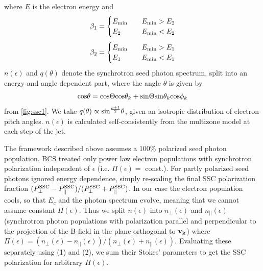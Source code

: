 where $E$ is the electron energy and
\begin{equation} 
\beta_1 =
  \begin{cases}
    E_{\rm min}       & \quad  E_{\rm min} > E_2\\
    E_2  & \quad  E_{\rm min} < E_2\\
  \end{cases}
\end{equation}
\begin{equation}
\beta_2 =
  \begin{cases}
    E_{\rm min}       & \quad  E_{\rm min} > E_1\\
    E_1  & \quad  E_{\rm min} < E_1\\
  \end{cases}
\end{equation}
$n(\epsilon)$ and $q(\theta)$ denote the synchrotron seed photon spectrum, split into an energy and angle dependent part, where the angle $\theta$ is given by 
\begin{equation}
    {\rm cos}\theta = {\rm cos}\Theta {\rm cos}\theta_k + {\rm sin} \Theta {\rm sin} \theta_k {\rm cos} \phi_k 
\end{equation}
from \cref{fig:ssc1}. We take $q(\theta) \propto {\rm sin}^{\frac{p+1}{2}}\theta$, given an isotropic distribution of electron pitch angles. $n(\epsilon)$ is calculated self-consistently from the multizone model at each step of the jet. %

 The framework described above assumes a 100\% polarized seed photon population. BCS treated only power law electron populations with synchrotron polarization independent of $\epsilon$ (i.e. $\Pi(\epsilon) =$ const.). For partly polarized seed photons \citet{bonometto_polarization_1970} ignored energy dependence, simply re-scaling the final SSC polarization fraction $(P^{\rm SSC}_{\perp} - P^{\rm SSC}_{||})/(P^{\rm SSC}_{\perp} + P^{\rm SSC}_{||})$. In our case the electron population cools, so that $E_c$ and the photon spectrum evolve, meaning that we cannot assume constant $\Pi(\epsilon)$. Thus we split $n(\epsilon)$ into $n_{\perp}(\epsilon)$ and $n_{||}(\epsilon)$ (synchrotron photon populations with polarization parallel and perpendicular to the projection of the B-field in the plane orthogonal to $\bf{v_k}$) where $\Pi(\epsilon) = (n_{\perp}(\epsilon) - n_{||}(\epsilon))/(n_{\perp}(\epsilon) + n_{||}(\epsilon))$. Evaluating these separately using (1) and (2), we sum their Stokes' parameters to get the SSC polarization for arbitrary $\Pi(\epsilon)$. 
 
